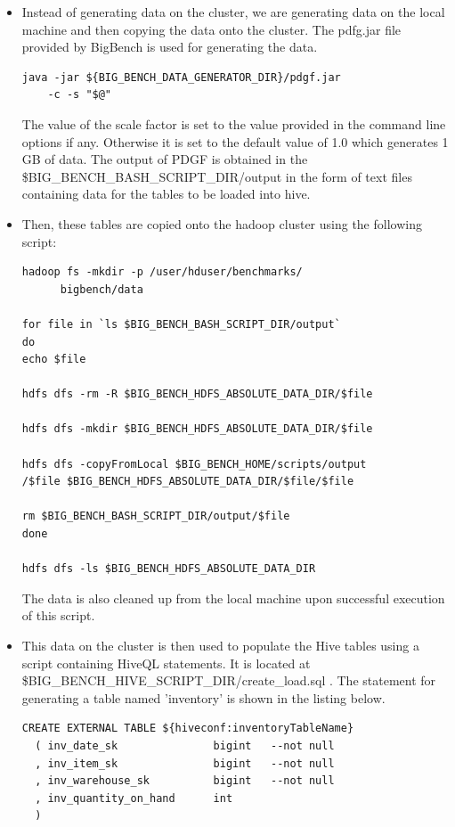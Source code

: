 \documentclass[12pt]{book}
\begin{document}
\begin{itemize}
\item Instead of generating data on the cluster, we are generating data on the local machine and then copying the data onto the cluster.
The pdfg.jar file provided by BigBench is used for generating the data. 
\lstset{language=Java,basicstyle=\ttfamily,showspaces=false, showstringspaces=false}
\begin{lstlisting}[caption="Data Generation Command",frame=single]
java -jar ${BIG_BENCH_DATA_GENERATOR_DIR}/pdgf.jar 
	-c -s "$@"
\end{lstlisting}
The value of the scale factor is set to the value provided in the command line options if any. Otherwise it is set to the default value of 1.0
which generates 1 GB of data.
The output of PDGF is obtained in the \$BIG\_BENCH\_BASH\_SCRIPT\_DIR/output in the form of text files containing data for the tables to be 
loaded into hive.

\item Then, these tables are copied onto the hadoop cluster using the following script:
\lstset{language=sh,basicstyle=\ttfamily,showspaces=false, showstringspaces=false}
\begin{lstlisting}[caption="Push data onto HDFS",frame=single]
hadoop fs -mkdir -p /user/hduser/benchmarks/
      bigbench/data

for file in `ls $BIG_BENCH_BASH_SCRIPT_DIR/output`
do
echo $file

hdfs dfs -rm -R $BIG_BENCH_HDFS_ABSOLUTE_DATA_DIR/$file

hdfs dfs -mkdir $BIG_BENCH_HDFS_ABSOLUTE_DATA_DIR/$file

hdfs dfs -copyFromLocal $BIG_BENCH_HOME/scripts/output
/$file $BIG_BENCH_HDFS_ABSOLUTE_DATA_DIR/$file/$file

rm $BIG_BENCH_BASH_SCRIPT_DIR/output/$file
done

hdfs dfs -ls $BIG_BENCH_HDFS_ABSOLUTE_DATA_DIR

\end{lstlisting}
The data is also cleaned up from the local machine upon successful execution of this script.

\item This data on the cluster is then used to populate the Hive tables using a script containing HiveQL statements. It is located at 
\$BIG\_BENCH\_HIVE\_SCRIPT\_DIR/create\_load.sql .
\newline
\newline
The statement for generating a table named 'inventory' is shown in the listing below.
\lstset{language=SQL,basicstyle=\ttfamily,showspaces=false, showstringspaces=false}
\begin{lstlisting}[caption="Populate Hive Tables",frame=single]
CREATE EXTERNAL TABLE ${hiveconf:inventoryTableName}
  ( inv_date_sk               bigint   --not null
  , inv_item_sk               bigint   --not null
  , inv_warehouse_sk          bigint   --not null
  , inv_quantity_on_hand      int
  )
  

\end{lstlisting}
\end{itemize}
\end{document}
